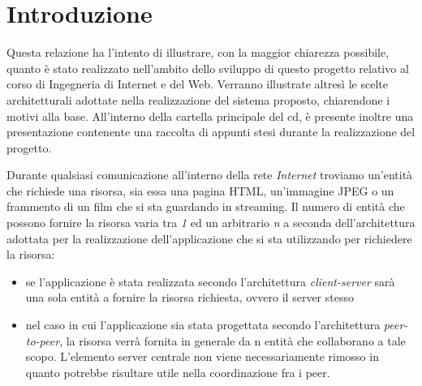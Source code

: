 \documentclass[paper=a4, oneside, fontsize=14pt, titlepage]{article}
\begin{document}
	\section{Introduzione}
		\begin{flushleft}
			Questa relazione ha l'intento di illustrare, con la maggior chiarezza possibile, quanto è stato realizzato nell'ambito dello sviluppo di questo progetto relativo al corso di Ingegneria di Internet e del Web. Verranno illustrate altresì le scelte architetturali adottate nella realizzazione del sistema proposto, chiarendone i motivi alla base. All'interno della cartella principale del cd, è presente inoltre una presentazione contenente una raccolta di appunti stesi durante la realizzazione del progetto.
		\end{flushleft}
		\begin{center}
			\hspace{1cm}
		\end{center}
		\begin{flushleft}
			Durante qualsiasi comunicazione all'interno della rete \textit{Internet} troviamo un'entità che richiede una risorsa, sia essa una pagina HTML, un'immagine JPEG o un frammento di un film che si sta guardando in streaming. Il numero di entità che possono fornire la risorsa varia tra \textit{1} ed un arbitrario \textit{n} a seconda dell'architettura adottata per la realizzazione dell'applicazione che si sta utilizzando per richiedere la risorsa:
		\end{flushleft}
		\begin{itemize}
			\item se l'applicazione è stata realizzata secondo l'architettura \textit{client-server} sarà una sola entità a fornire la risorsa richiesta, ovvero il server stesso
			\item nel caso in cui l'applicazione sia stata progettata secondo l'architettura \textit{peer-to-peer}, la risorsa verrà fornita in generale da n entità che collaborano a tale scopo. L'elemento server centrale non viene necessariamente rimosso in quanto potrebbe risultare utile nella coordinazione fra i peer.
		\end{itemize}
\end{document}
